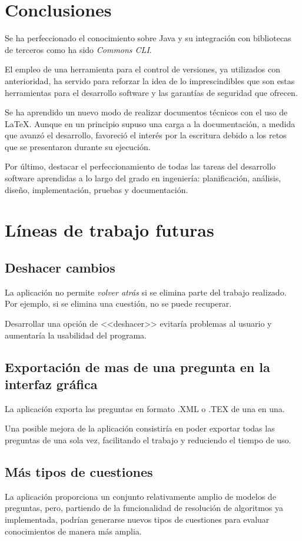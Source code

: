 \section{Conclusiones}

Se ha perfeccionado el conocimiento sobre Java y su integración con bibliotecas de terceros como ha sido \textit{Commons CLI}.

El empleo de una herramienta para el control de versiones, ya utilizados con anterioridad,
ha servido para reforzar la idea de lo imprescindibles que son estas herramientas para el
desarrollo software y las garantías de seguridad que ofrecen.

Se ha aprendido un nuevo modo de realizar documentos técnicos con el uso de \LaTeX{}. Aunque
en un principio supuso una carga a la documentación, a medida que avanzó el desarrollo, favoreció el interés por la escritura debido a los retos que se presentaron durante su ejecución.

Por último, destacar el perfeccionamiento de todas las tareas del desarrollo software aprendidas a lo largo del grado en ingeniería: planificación,
análisis, diseño, implementación, pruebas y documentación.
\section{Líneas de trabajo futuras}

\subsection{Deshacer cambios}
La aplicación no permite \textit{volver atrás} si se elimina parte del trabajo realizado. Por ejemplo, si se elimina una cuestión, no se puede recuperar.

Desarrollar una opción de <<deshacer>> evitaría problemas al usuario y aumentaría la usabilidad del programa.

\subsection{Exportación de mas de una pregunta en la interfaz gráfica}
La aplicación exporta las preguntas en formato .XML o .TEX de una en una.

Una posible mejora de la aplicación consistiría en poder exportar todas las preguntas de una sola vez, facilitando el trabajo y reduciendo el tiempo de uso.

\subsection{Más tipos de cuestiones}
 La aplicación proporciona un conjunto relativamente amplio de modelos de preguntas, pero, partiendo de la funcionalidad de resolución de algoritmos ya implementada, podrían generarse nuevos tipos de cuestiones para evaluar conocimientos de manera más amplia. 

